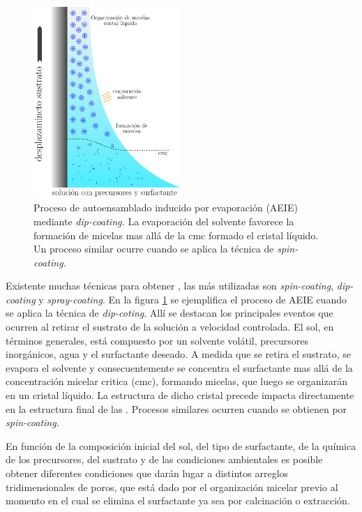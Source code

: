 	 	\begin{figure}[h!]
 				\begin{center}
 				\includegraphics[width=0.5\textwidth]{Esquemas/autoensam.pdf}
 				\caption[Proceso de autoensamblado inducido por evaporación (AEIE)]{Proceso de autoensamblado inducido por evaporación (AEIE) mediante \textit{dip-coating.} La evaporación del solvente favorece la formación de micelas mas allá de la cmc formado el cristal líquido. Un proceso similar ocurre cuando se aplica la técnica de \textit{spin-coating.}}
 		   		\label{fig:autoensam}
 		    	\end{center}
 		    	\end{figure}

	 Existente muchas técnicas para obtener \pdm\space, las más utilizadas son \textit{spin-coating}, \textit{dip-coating} y \textit{spray-coating}. En la figura \ref{fig:autoensam} se ejemplifica el proceso de AEIE cuando se aplica la técnica de \textit{dip-coting}. Allí se destacan los principales eventos que ocurren al retirar el sustrato de la solución a velocidad controlada. El sol, en términos generales, está compuesto por un solvente volátil, precursores inorgánicos, agua y el surfactante deseado. A medida que se retira el sustrato, se evapora el solvente y consecuentemente se concentra el surfactante mas allá de la concentración micelar critica (cmc), formando micelas, que luego se organizarán en un cristal líquido. La estructura de dicho cristal precede impacta directamente en la estructura final de las \pdm. Procesos similares ocurren cuando se obtienen \pdm\space por \textit{spin-coating}. 
 				
   	 En función de la composición inicial del sol, del tipo de surfactante, de la química de los precursores, del sustrato y de las condiciones ambientales es posible obtener diferentes condiciones que darán lugar a distintos arreglos tridimensionales de poros, que está dado por el organización micelar previo al momento en el cual se elimina el surfactante ya sea por calcinación o extracción.\cite{Grosso2004,Grosso2002,Crepaldi2002a,Grosso2003,Violi2015} 
	

